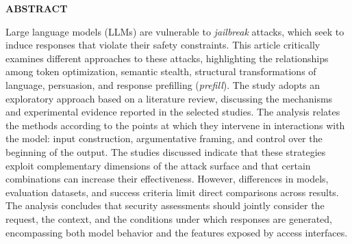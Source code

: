 \textbf{\MakeUppercase{Abstract}}

Large language models (LLMs) are vulnerable to \textit{jailbreak} attacks, 
which seek to induce responses that violate their safety constraints. This 
article critically examines different approaches to these attacks, 
highlighting the relationships among token optimization, semantic 
stealth, structural transformations of language, persuasion, and response 
prefilling (\textit{prefill}). The study adopts an exploratory approach 
based on a literature review, discussing the mechanisms and experimental 
evidence reported in the selected studies. The analysis relates the methods 
according to the points at which they intervene in interactions with the 
model: input construction, argumentative framing, and control over the 
beginning of the output. The studies discussed indicate that these strategies 
exploit complementary dimensions of the attack surface and that certain 
combinations can increase their effectiveness. However, differences in 
models, evaluation datasets, and success criteria limit direct comparisons 
across results. The analysis concludes that security assessments should 
jointly consider the request, the context, and the conditions under which 
responses are generated, encompassing both model behavior and the features 
exposed by access interfaces.


